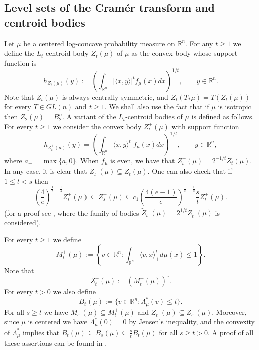 \documentclass[11pt,leqno]{article}
\theoremstyle{definition}
\theoremstyle{remark}
\numberwithin{equation}{section}
\newcommand{\ls}{\leqslant}
\newcommand{\gr}{\geqslant}
\newcommand{\1}{\textbf{1}}
\begin{document}
\subsection{Level sets of the Cram\'{e}r transform and centroid bodies}\label{subsection-2.2}

Let $\mu$ be a centered log-concave probability measure on $\mathbb R^n$. For any $t\gr 1$ we define the
$L_t$-centroid body $Z_t(\mu)$ of $\mu $ as the convex body whose support function is
\begin{equation*} h_{Z_t(\mu)}(y):=\left(
\int_{\mathbb R^n} |\langle x,y\rangle|^t f_{\mu}(x)dx \right)^{1/t},\qquad y\in {\mathbb R}^n.
\end{equation*} Note that $Z_t(\mu )$ is always centrally symmetric,
and $Z_t(T_{\ast}\mu)=T(Z_t(\mu ))$ for every $T\in GL(n)$ and $t\gr 1$.
We shall also use the fact that if $\mu$ is isotropic then
$Z_2(\mu)=B_2^n$. A variant of the $L_t$-centroid bodies of $\mu $ is defined as follows. For every $t\gr 1$ we consider the convex body
$Z_t^+(\mu )$ with support function
\begin{equation*}h_{Z_t^+(\mu )}(y)=\left (\int_{{\mathbb R}^n}\langle
x,y\rangle_+^tf_{\mu }(x)dx\right )^{1/t},\qquad y\in {\mathbb R}^n,\end{equation*} where $a_+=\max
\{a,0\}$. When $f_{\mu }$ is even, we have that $Z_t^+(\mu )=2^{-1/t}Z_t(\mu )$. In any case, it is clear that
$Z_t^+(\mu )\subseteq Z_t(\mu )$. One can also check that if $1\ls t<s$ then
\begin{equation}\label{eq:regularity}\left(\frac{4}{e}\right)^{\frac{1}{t}-\frac{1}{s}}Z_t^+(\mu )\subseteq Z_s^+(\mu )
\subseteq c_1\left(\frac{4(e-1)}{e}\right)^{\frac{1}{t}-\frac{1}{s}}\frac{s}{t}Z_t^+(\mu ).\end{equation}
(for a proof see \cite{Guedon-EMilman-2011}, where the family of bodies $\tilde{Z}_t^+(\mu)=2^{1/t}Z_t^+(\mu)$ is considered).

For every $t\gr 1$ we define \begin{equation*}M^+_t(\mu) := \left\{v\in {\mathbb R}^n : \int_{{\mathbb R}^n} \langle v, x\rangle_+^td\mu(x)\ls 1\right\}.\end{equation*}Note that
\begin{equation*}Z^+_t(\mu) := (M^+_t(\mu))^{\circ}.\end{equation*}For every $t>0$ we also define
\begin{equation*}B_t(\mu):=\{v\in{\mathbb R}^n:\Lambda^{\ast}_{\mu}(v)\ls t\}.\end{equation*}
For all $s\gr t$ we have $M^+_s(\mu)\subseteq M^+_t(\mu)$ and $Z_t^+(\mu) \subseteq Z_s^+(\mu)$.
Moreover, since $\mu $ is centered we have $\Lambda^{\ast }_{\mu }(0)=0$ by Jensen's inequality, and the convexity
of $\Lambda^{\ast}_{\mu }$ implies that $B_t(\mu) \subseteq B_s(\mu) \subseteq
\frac{s}{t}B_t(\mu)$ for all $s\gr t>0$. A proof of all these assertions
can be found in \cite{BGVV-book}.
\end{document}
